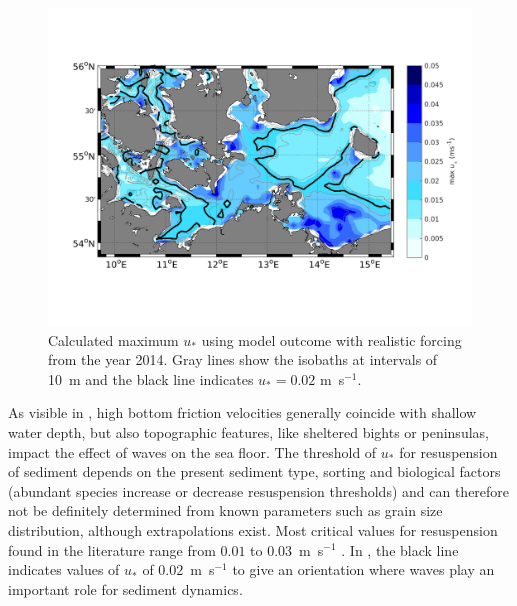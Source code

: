 \begin{figure}[ht]
 \includegraphics[width=16cm]{bilder/ubot_real.png}
 \caption{Calculated maximum $u_\ast$ using model outcome with realistic 
forcing from the year 2014. Gray lines show the 
isobaths at intervals of 10~m and the black line indicates $u_\ast = 0.02$ 
m~s$^{-1}$.\label{ustar_real}}
\end{figure}
\FloatBarrier
As visible in , high bottom friction velocities generally 
coincide with shallow water depth, but also topographic features, like 
sheltered bights or peninsulas, impact the effect of waves on the sea floor. 
The threshold of $u_\ast$ for resuspension of sediment depends on the present 
sediment type, sorting and biological factors (abundant species increase or 
decrease resuspension thresholds) and can therefore not be definitely determined 
from known parameters such as grain size distribution, although extrapolations 
exist. Most critical 
values for resuspension found in the literature range from $0.01$ to 
$0.03$~m~s$^{-1}$ \citep[][]{jonsson2004}. In , the black line 
indicates values of $u_\ast$ of $0.02$~m~s$^{-1}$ to give an orientation where 
waves play an important role for sediment dynamics.
% 
\FloatBarrier
